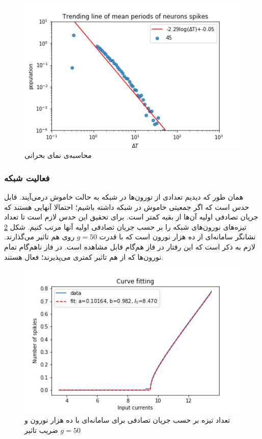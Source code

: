 \documentclass[12pt,onecolumn,a4paper]{article}
\begin{document}
\begin{figure}[h]
\centering
  \includegraphics[width = 10 cm]{figs/Rotational/mean_spiking_periods_with_trending_line.png}
 \caption{محاسبه‌ی نمای بحرانی}
  \label{fig:interspikes_rotational_trending_line}
\end{figure}


\subsubsection{فعالیت شبکه}
همان طور که دیدیم تعدادی از نورون‌ها در شبکه به حالت خاموش درمی‌آیند. قابل حدس است که اگر جمعیتی خاموش در شبکه داشته باشیم؛ احتمالا آنهایی هستند که جریان تصادفی اولیه آن‌ها از بقیه کمتر است. برای تحقیق این حدس لازم است تا تعداد تیزه‌های نورون‌های شبکه را بر حسب جریان تصادفی اولیه آنها مرتب کنیم. شکل \ref{fig:spikes_num_vs_background_current} نشانگر سامانه‌ای از ده هزار نورون است که با قدرت $g=50$ روی هم تاثیر می‌گذارند. لازم به ذکر است که این رفتار در فاز هم‌گام قابل مشاهده است. در فاز ناهم‌گام تمام نورون‌ها که از هم تاثیر کمتری می‌پذیرند؛ فعال هستند.


\begin{figure}[h]
\centering
  \includegraphics[width = 10 cm]{figs/Rotational/spikies_num_vs_input_fitted_curve_g50_input_3.5_13.5.png}
 \caption{تعداد تیزه بر حسب جریان تصادفی برای سامانه‌ای با ده هزار نورون و ضریب تاثیر $g=50$}
  \label{fig:spikes_num_vs_background_current}
\end{figure}
\end{document}
